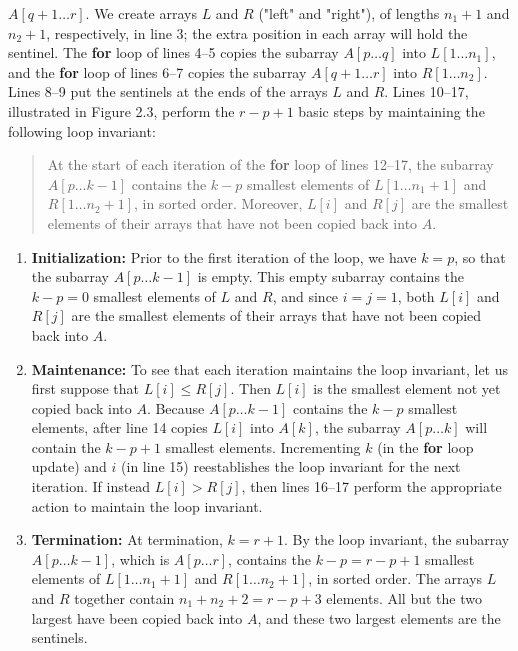 \documentclass{report}
\begin{document}
        $A[q + 1 \dots r]$. We create arrays $L$ and $R$ ("left" and "right"), of lengths $n_1 + 1$ 
        and $n_2 + 1$, respectively, in line 3; the extra position in each array will hold the 
        sentinel. The \textbf{for} loop of lines 4--5 copies the subarray $A[p \dots q]$ into 
        $L[1 \dots n_1]$, and the \textbf{for} loop of lines 6--7 copies the subarray 
        $A[q + 1 \dots r]$ into $R[1 \dots n_2]$. Lines 8--9 put the sentinels at the ends of the 
        arrays $L$ and $R$. Lines 10--17, illustrated in Figure 2.3, perform the $r-p + 1$ basic steps by maintaining the following loop invariant:
        \bigbreak \noindent 
        \begin{quote}
            At the start of each iteration of the \textbf{for} loop of lines 12--17, the subarray 
            $A[p \dots k - 1]$ contains the $k - p$ smallest elements of $L[1 \dots n_1 + 1]$ and 
            $R[1 \dots n_2 + 1]$, in sorted order. Moreover, $L[i]$ and $R[j]$ are the smallest 
            elements of their arrays that have not been copied back into $A$.
        \end{quote}
        \begin{enumerate}
            \item \textbf{Initialization:} Prior to the first iteration of the loop, we have $k = p$, so that the subarray $A[p \dots k - 1]$ is empty. This empty subarray contains the $k - p = 0$ smallest elements of $L$ and $R$, and since $i = j = 1$, both $L[i]$ and $R[j]$ are the smallest elements of their arrays that have not been copied back into $A$.
            \item \textbf{Maintenance:} To see that each iteration maintains the loop invariant, let us first suppose that $L[i] \leq R[j]$. Then $L[i]$ is the smallest element not yet copied back into $A$. Because $A[p \dots k - 1]$ contains the $k - p$ smallest elements, after line 14 copies $L[i]$ into $A[k]$, the subarray $A[p \dots k]$ will contain the $k - p + 1$ smallest elements. Incrementing $k$ (in the \textbf{for} loop update) and $i$ (in line 15) reestablishes the loop invariant for the next iteration. If instead $L[i] > R[j]$, then lines 16--17 perform the appropriate action to maintain the loop invariant.
            \item \textbf{Termination:} At termination, $k = r + 1$. By the loop invariant, the subarray $A[p \dots k - 1]$, which is $A[p \dots r]$, contains the $k - p = r - p + 1$ smallest elements of $L[1 \dots n_1 + 1]$ and $R[1 \dots n_2 + 1]$, in sorted order. The arrays $L$ and $R$ together contain $n_1 + n_2 + 2 = r - p + 3$ elements. All but the two largest have been copied back into $A$, and these two largest elements are the sentinels.
        \end{enumerate}
\end{document}
